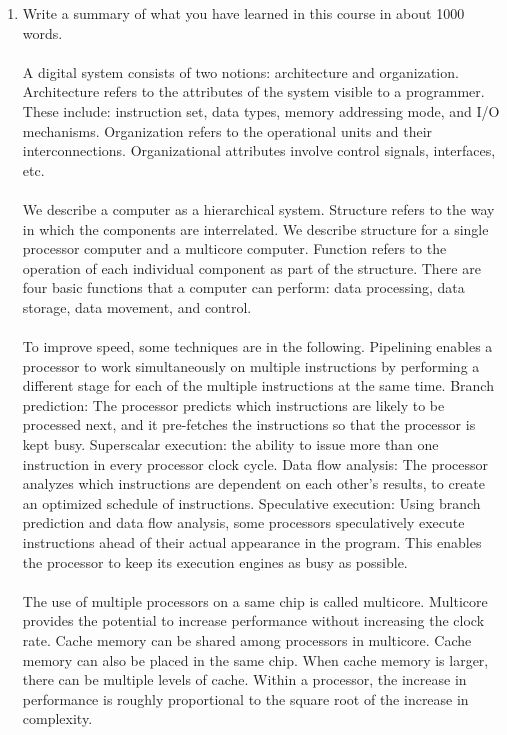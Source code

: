 \documentclass{article}
\begin{document}
\begin{enumerate}
	\raggedright
	\item Write a summary of what you have learned in this course in about 1000 words.
	      \paragraph{} A digital system consists of two notions: architecture and organization.
	      Architecture refers to the attributes of the system visible to a programmer. These include: instruction set, data types, memory
	      addressing mode, and I/O mechanisms. Organization refers to the operational units and their
	      interconnections. Organizational attributes involve control signals, interfaces, etc.

	      \paragraph{} We describe a computer as a hierarchical system. Structure refers to the way in which the
	      components are interrelated. We describe structure for a single processor computer and a multicore computer.
	      Function refers to the operation of each individual component as part of the structure. There
	      are four basic functions that a computer can perform: data processing, data storage, data movement,
	      and control.

	      \paragraph{} To improve speed, some techniques are in the following. Pipelining
	      enables a processor to work simultaneously on multiple instructions by performing a different stage for
	      each of the multiple instructions at the same time. Branch prediction: The processor predicts which instructions are likely to be
	      processed next, and it pre-fetches the instructions so that the processor is kept busy.
	      Superscalar execution: the ability to issue more than one instruction in every processor
	      clock cycle. Data flow analysis: The processor analyzes which instructions are dependent on each other’s
	      results, to create an optimized schedule of instructions.
	      Speculative execution: Using branch prediction and data flow analysis, some processors
	      speculatively execute instructions ahead of their actual appearance in the program. This enables the
	      processor to keep its execution engines as busy as possible.

	      \paragraph{} The use of multiple processors on a same chip is called multicore.
	      Multicore provides the potential to increase performance without increasing the clock rate.
	      Cache memory can be shared among processors in multicore. Cache memory can also be placed in the
	      same chip. When cache memory is larger, there can be multiple levels of cache.
	      Within a processor, the increase in performance is roughly proportional to the square root of the
	      increase in complexity.


\end{enumerate}
\end{document}
